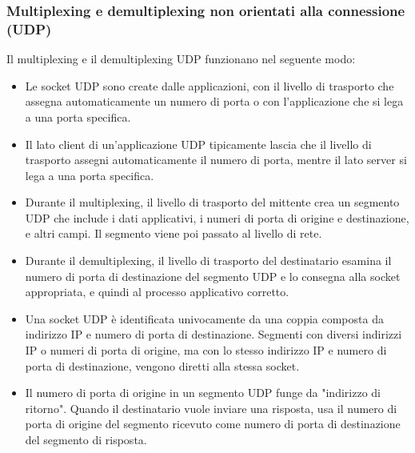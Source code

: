 \subsubsection*{Multiplexing e demultiplexing non orientati alla connessione (UDP)}
Il multiplexing e il demultiplexing UDP funzionano nel seguente modo:
\begin{itemize}
    \item Le socket UDP sono create dalle applicazioni, con il livello di trasporto che assegna automaticamente un numero di porta o con l'applicazione che si lega a una porta specifica.
    \item Il lato client di un'applicazione UDP tipicamente lascia che il livello di trasporto assegni automaticamente il numero di porta, mentre il lato server si lega a una porta specifica.
    \item Durante il multiplexing, il livello di trasporto del mittente crea un segmento UDP che include i dati applicativi, i numeri di porta di origine e destinazione, e altri campi. Il segmento viene poi passato al livello di rete.
    \item Durante il demultiplexing, il livello di trasporto del destinatario esamina il numero di porta di destinazione del segmento UDP e lo consegna alla socket appropriata, e quindi al processo applicativo corretto.
    \item Una socket UDP è identificata univocamente da una coppia composta da indirizzo IP e numero di porta di destinazione. Segmenti con diversi indirizzi IP o numeri di porta di origine, ma con lo stesso indirizzo IP e numero di porta di destinazione, vengono diretti alla stessa socket.
    \item Il numero di porta di origine in un segmento UDP funge da "indirizzo di ritorno". Quando il destinatario vuole inviare una risposta, usa il numero di porta di origine del segmento ricevuto come numero di porta di destinazione del segmento di risposta.
\end{itemize}

